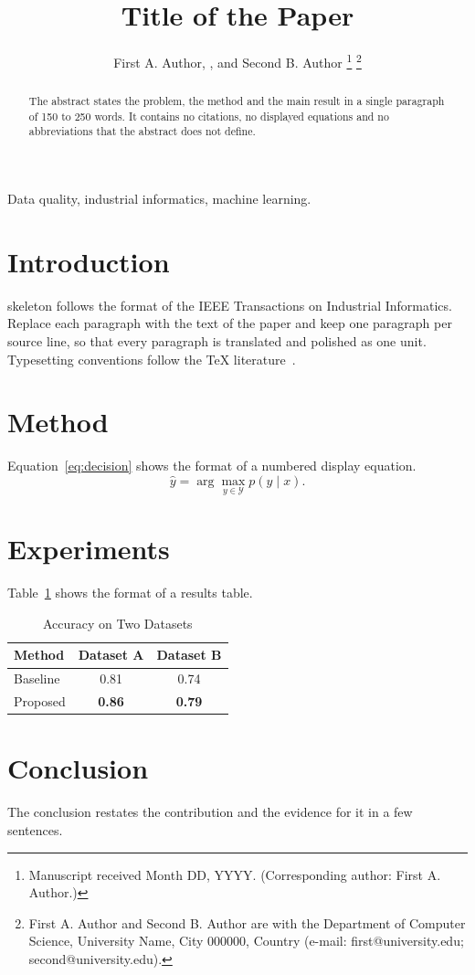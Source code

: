 \documentclass[journal,twoside,web]{ieeecolor}
\begin{document}
\title{Title of the Paper}
\author{First A. Author, , and Second B. Author
\thanks{Manuscript received Month DD, YYYY. (Corresponding author: First A. Author.)}
\thanks{First A. Author and Second B. Author are with the Department of Computer Science, University Name, City 000000, Country (e-mail: first@university.edu; second@university.edu).}}

\maketitle

\begin{abstract}
The abstract states the problem, the method and the main result in a single paragraph of 150 to 250 words. It contains no citations, no displayed equations and no abbreviations that the abstract does not define.
\end{abstract}

\begin{IEEEkeywords}
Data quality, industrial informatics, machine learning.
\end{IEEEkeywords}

\section{Introduction}
\label{sec:introduction}
 skeleton follows the format of the IEEE Transactions on Industrial Informatics. Replace each paragraph with the text of the paper and keep one paragraph per source line, so that every paragraph is translated and polished as one unit. Typesetting conventions follow the \TeX{} literature~\cite{knuth1984,lamport1994}.

\section{Method}
\label{sec:method}
Equation~\eqref{eq:decision} shows the format of a numbered display equation.
\begin{equation}
  \hat{y} = \arg\max_{y \in \mathcal{Y}} p(y \mid x).
  \label{eq:decision}
\end{equation}

\section{Experiments}
\label{sec:experiments}
Table~\ref{tab:results} shows the format of a results table.
\begin{table}[t]
  \centering
  \caption{Accuracy on Two Datasets}
  \label{tab:results}
  \begin{tabular}{lcc}
    \toprule
    Method & Dataset A & Dataset B \\
    \midrule
    Baseline & 0.81 & 0.74 \\
    Proposed & \textbf{0.86} & \textbf{0.79} \\
    \bottomrule
  \end{tabular}
\end{table}

\section{Conclusion}
\label{sec:conclusion}
The conclusion restates the contribution and the evidence for it in a few sentences.



\end{document}
